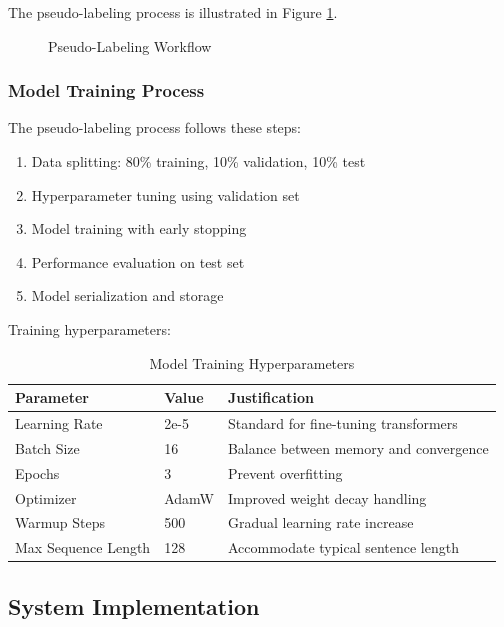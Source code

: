 \documentclass[12pt,a4paper]{report}
\begin{document}
The pseudo-labeling process is illustrated in Figure \ref{fig:pseudo_labeling}.

\begin{figure}[H]
    \centering
    
    \caption{Pseudo-Labeling Workflow}
    \label{fig:pseudo_labeling}
\end{figure}

\subsubsection{Model Training Process}
The pseudo-labeling process follows these steps:

\begin{enumerate}
    \item Data splitting: 80\% training, 10\% validation, 10\% test
    \item Hyperparameter tuning using validation set
    \item Model training with early stopping
    \item Performance evaluation on test set
    \item Model serialization and storage
\end{enumerate}

Training hyperparameters:

\begin{table}[H]
\centering
\caption{Model Training Hyperparameters}
\label{tab:hyperparameters}
\begin{tabular}{@{}lll@{}}
\toprule
\textbf{Parameter} & \textbf{Value} & \textbf{Justification} \\ \midrule
Learning Rate & 2e-5 & Standard for fine-tuning transformers \\
Batch Size & 16 & Balance between memory and convergence \\
Epochs & 3 & Prevent overfitting \\
Optimizer & AdamW & Improved weight decay handling \\
Warmup Steps & 500 & Gradual learning rate increase \\
Max Sequence Length & 128 & Accommodate typical sentence length \\ \bottomrule
\end{tabular}
\end{table}

\subsection{System Implementation}
\end{document}
